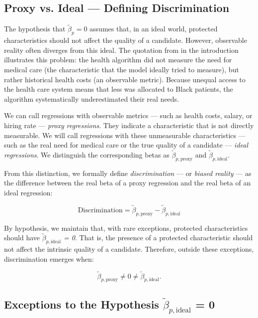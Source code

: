 \documentclass[jair,11pt,letterpaper]{article}
\begin{document}
\subsection{Proxy vs. Ideal --- Defining Discrimination}


The hypothesis that $\tilde{\beta}_p = 0$ assumes that, in an ideal world,
protected characteristics should not affect the quality of a
candidate. However, observable reality often diverges
from this ideal. The quotation from  in the introduction illustrates
this problem: the health algorithm did not measure the need for medical
care (the characteristic that the model ideally tried to measure), but rather historical health
costs (an observable metric). Because unequal access to the health care system means that less was allocated to
Black patients, the algorithm systematically underestimated their
real needs.

We can call regressions with observable metrics --- such as health
costs, salary, or hiring rate --- \textit{proxy regressions}.
They indicate a characteristic that is not directly measurable. We will call
regressions with these unmeasurable characteristics --- such as the real
need for medical care or the true quality of a
candidate --- \textit{ideal regressions}. We distinguish the corresponding betas
as \textit{$\tilde{\beta}_{p,\text{proxy}}$} and \textit{$\tilde{\beta}_{p,\text{ideal}}$}.

From this distinction, we formally define \textit{discrimination} --- or
\textit{biased reality} --- as the difference between the real beta of a
proxy regression and the real beta of an ideal regression:

\begin{equation}
\text{Discrimination} = \tilde{\beta}_{p,\text{proxy}} - \tilde{\beta}_{p,\text{ideal}}
\end{equation}

By hypothesis, we maintain that, with rare exceptions, protected
characteristics should have \textit{$\tilde{\beta}_{p,\text{ideal}}$ = 0}. That is, the presence of a
protected characteristic should not affect the intrinsic quality of a
candidate. Therefore, outside these exceptions, discrimination emerges
when:

\[
\tilde{\beta}_{p,\text{proxy}} \neq 0 \neq \tilde{\beta}_{p,\text{ideal}}.
\]


\subsection{Exceptions to the Hypothesis $\tilde{\beta}_{p,\text{ideal}}$ = 0}
\end{document}
